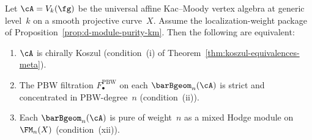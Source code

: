 \begin{proposition}
\label{prop:d-module-purity-km-equivalence}
Let $\cA = V_k(\fg)$ be the universal affine Kac--Moody
vertex algebra at generic level~$k$ on a smooth projective
curve~$X$. Assume the localization-weight package of
Proposition~\ref{prop:d-module-purity-km}. Then the following are
equivalent:
\begin{enumerate}[label=\textup{(\alph*)}]
\item $\cA$ is chirally Koszul
 \textup{(}condition~\textup{(i)} of
 Theorem~\textup{\ref{thm:koszul-equivalences-meta}}\textup{)}.
\item The PBW filtration $F_\bullet^{\mathrm{PBW}}$ on each
 $\barBgeom_n(\cA)$ is strict and concentrated in
 PBW-degree~$n$
 \textup{(}condition~\textup{(ii)}\textup{)}.
\item Each $\barBgeom_n(\cA)$ is pure of weight~$n$ as a
 mixed Hodge module on~$\FM_n(X)$
 \textup{(}condition~\textup{(xii)}\textup{)}.
\end{enumerate}
\end{proposition}

